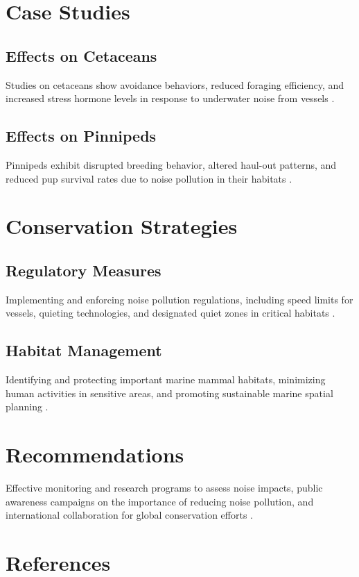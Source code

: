 \documentclass[12pt]{article}
\begin{document}
\section{Case Studies}
\subsection{Effects on Cetaceans}
Studies on cetaceans show avoidance behaviors, reduced foraging efficiency, and increased stress hormone levels in response to underwater noise from vessels \citep{southall2007marine, tyack2011beaked}.

\subsection{Effects on Pinnipeds}
Pinnipeds exhibit disrupted breeding behavior, altered haul-out patterns, and reduced pup survival rates due to noise pollution in their habitats \citep{acevedo2018effects, eguchi2019impact}.

\section{Conservation Strategies}
\subsection{Regulatory Measures}
Implementing and enforcing noise pollution regulations, including speed limits for vessels, quieting technologies, and designated quiet zones in critical habitats \citep{mccormick2019regulatory, bain2016mitigating}.

\subsection{Habitat Management}
Identifying and protecting important marine mammal habitats, minimizing human activities in sensitive areas, and promoting sustainable marine spatial planning \citep{costa2019habitat, smith2014habitat}.

\section{Recommendations}
Effective monitoring and research programs to assess noise impacts, public awareness campaigns on the importance of reducing noise pollution, and international collaboration for global conservation efforts \citep{simmonds2018marine, sparrow2020global}.

\section*{References}


\end{document}
